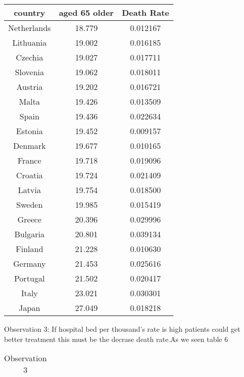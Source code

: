 \documentclass[a4 paper]{article}
\newcommand{\0}{\mathbf{0}}
\begin{document}
\begin{itemize}
\begin{table}[!ht]
\begin{tabular}{|c|c|c|}
        country & aged 65 older & Death Rate\\\hline
        Netherlands & 18.779 & 0.012167\\\hline
        Lithuania & 19.002 & 0.016185\\\hline
        Czechia & 19.027 & 0.017711\\\hline
        Slovenia & 19.062 & 0.018011\\\hline
        Austria & 19.202 & 0.016721\\\hline
        Malta & 19.426 & 0.013509\\\hline
        Spain & 19.436 & 0.022634\\\hline
        Estonia & 19.452 & 0.009157\\\hline
        Denmark & 19.677 & 0.010165\\\hline
        France & 19.718 & 0.019096\\\hline
        Croatia & 19.724 & 0.021409\\\hline
        Latvia & 19.754 & 0.018500\\\hline
        Sweden & 19.985 & 0.015419\\\hline
        Greece & 20.396 & 0.029996\\\hline
        Bulgaria & 20.801 & 0.039134\\\hline
        Finland & 21.228 & 0.010630\\\hline
        Germany & 21.453 & 0.025616\\\hline
        Portugal & 21.502 & 0.020417\\\hline
        Italy & 23.021 & 0.030301\\\hline
        Japan & 27.049 & 0.018218\\\hline
    
    \end{tabular}
    \end{table}
	
	Observation 3:\newline
	If hospital bed per thousand's rate is high patients could get better treatment this must be the decrase death rate.As we seen table 6\newline 
	
	\begin{table}[!ht]
    \centering
    \caption{Observation 3}
    \label{tab:Ob3}
    \begin{tabular}{|c|c|c|}
    \hline
	

\end{tabular}
\end{table}
\end{itemize}
\end{document}
